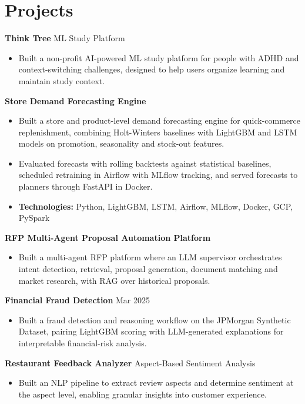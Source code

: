 \documentclass[10pt,a4paper]{article}
\begin{document}
\section{Projects}
\textbf{Think Tree} \textbar{} ML Study Platform\par
\begin{itemize}
  \item Built a non-profit AI-powered ML study platform for people with ADHD and context-switching challenges, designed to help users organize learning and maintain study context.
\end{itemize}
\textbf{Store Demand Forecasting Engine}\par
\begin{itemize}
  \item Built a store and product-level demand forecasting engine for quick-commerce replenishment, combining Holt-Winters baselines with LightGBM and LSTM models on promotion, seasonality and stock-out features.
  \item Evaluated forecasts with rolling backtests against statistical baselines, scheduled retraining in Airflow with MLflow tracking, and served forecasts to planners through FastAPI in Docker.
  \item \textbf{Technologies:} Python, LightGBM, LSTM, Airflow, MLflow, Docker, GCP, PySpark
\end{itemize}
\textbf{RFP Multi-Agent Proposal Automation Platform}\par
\begin{itemize}
  \item Built a multi-agent RFP platform where an LLM supervisor orchestrates intent detection, retrieval, proposal generation, document matching and market research, with RAG over historical proposals.
\end{itemize}
\textbf{Financial Fraud Detection} \textbar{} Mar 2025\par
\begin{itemize}
  \item Built a fraud detection and reasoning workflow on the JPMorgan Synthetic Dataset, pairing LightGBM scoring with LLM-generated explanations for interpretable financial-risk analysis.
\end{itemize}
\textbf{Restaurant Feedback Analyzer} \textbar{} Aspect-Based Sentiment Analysis\par
\begin{itemize}
  \item Built an NLP pipeline to extract review aspects and determine sentiment at the aspect level, enabling granular insights into customer experience.
\end{itemize}
\end{document}
